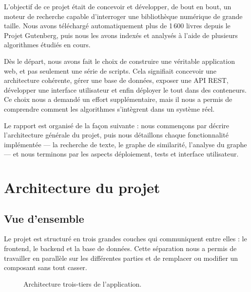 \documentclass[12pt,a4paper]{article}
\begin{document}
L'objectif de ce projet était de concevoir et développer, de bout en bout,
un moteur de recherche capable d'interroger une bibliothèque numérique de grande
taille. Nous avons téléchargé automatiquement plus de 1\,600 livres depuis le
Projet Gutenberg, puis nous les avons indexés et analysés à l'aide de plusieurs
algorithmes étudiés en cours.

Dès le départ, nous avons fait le choix de construire une véritable application
web, et pas seulement une série de scripts. Cela signifiait concevoir une
architecture cohérente, gérer une base de données, exposer une API REST,
développer une interface utilisateur et enfin déployer le tout dans des conteneurs.
Ce choix nous a demandé un effort supplémentaire, mais il nous a permis de
comprendre comment les algorithmes s'intègrent dans un système réel.

Le rapport est organisé de la façon suivante : nous commençons par décrire
l'architecture générale du projet, puis nous détaillons chaque fonctionnalité
implémentée — la recherche de texte, le graphe de similarité, l'analyse du graphe —
et nous terminons par les aspects déploiement, tests et interface utilisateur.

\section{Architecture du projet}

\subsection{Vue d'ensemble}

Le projet est structuré en trois grandes couches qui communiquent entre elles :
le frontend, le backend et la base de données. Cette séparation nous a permis
de travailler en parallèle sur les différentes parties et de remplacer ou
modifier un composant sans tout casser.

\begin{figure}[h]
\centering
{}
\caption{Architecture trois-tiers de l'application.}
\label{fig:archi}
\end{figure}
\end{document}
